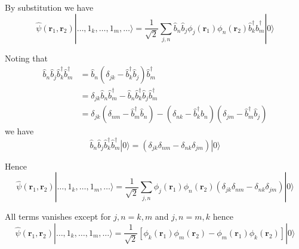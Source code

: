 


\bigskip
By substitution we have
\begin{equation*}
\hat\psi(\mathbf r_1,\mathbf r_2)
|\ldots,1_k,\ldots,1_m,\ldots\rangle
=\frac{1}{\sqrt2}\sum_{j,n}
\hat b_n\hat b_j\phi_j(\mathbf r_1)\phi_n(\mathbf r_2)
\hat b_k^\dag\hat b_m^\dag|0\rangle
\end{equation*}

Noting that
\begin{align*}
\hat b_n\hat b_j\hat b_k^\dag\hat b_m^\dag
&=\hat b_n(\delta_{jk}-\hat b_k^\dag\hat b_j)\hat b_m^\dag
\\
&=\delta_{jk}\hat b_n\hat b_m^\dag-\hat b_n\hat b_k^\dag\hat b_j\hat b_m^\dag
\\
&=\delta_{jk}(\delta_{nm}-\hat b_m^\dag\hat b_n)-
(\delta_{nk}-\hat b_k^\dag\hat b_n)(\delta_{jm}-\hat b_m^\dag\hat b_j)
\end{align*}
we have
\begin{equation*}
\hat b_n\hat b_j\hat b_k^\dag\hat b_m^\dag|0\rangle
=(\delta_{jk}\delta_{nm}-\delta_{nk}\delta_{jm})|0\rangle
\end{equation*}

Hence
\begin{equation*}
\hat\psi(\mathbf r_1,\mathbf r_2)
|\ldots,1_k,\ldots,1_m,\ldots\rangle
=\frac{1}{\sqrt2}\sum_{j,n}\phi_j(\mathbf r_1)\phi_n(\mathbf r_2)
(\delta_{jk}\delta_{nm}-\delta_{nk}\delta_{jm})|0\rangle
\end{equation*}

All terms vanishes except for $j,n=k,m$ and $j,n=m,k$ hence
\begin{equation*}
\hat\psi(\mathbf r_1,\mathbf r_2)
|\ldots,1_k,\ldots,1_m,\ldots\rangle
=\frac{1}{\sqrt2}\left[
\phi_k(\mathbf r_1)\phi_m(\mathbf r_2)-\phi_m(\mathbf r_1)\phi_k(\mathbf r_2)
\right]|0\rangle
\end{equation*}


